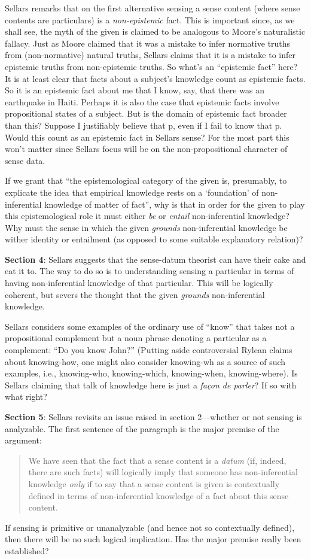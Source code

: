 \documentclass[11pt]{article}
\begin{document}
Sellars remarks that on the first alternative sensing a sense content (where sense contents are particulars) is a \emph{non-epistemic} fact. This is important since, as we shall see, the myth of the given is claimed to be analogous to Moore's naturalistic fallacy. Just as Moore claimed that it was a mistake to infer normative truths from (non-normative) natural truths, Sellars claims that it is a mistake to infer epistemic truths from non-epistemic truths. So what's an ``epistemic fact'' here? It is at least clear that facts about a subject's knowledge count as epistemic facts. So it is an epistemic fact about me that I know, say, that there was an earthquake in Haiti. Perhaps it is also the case that epistemic facts involve propositional states of a subject. But is the domain of epistemic fact broader than this? Suppose I justifiably believe that p, even if I fail to know that p. Would this count as an epistemic fact in Sellars sense? For the most part this won't matter since Sellars focus will be on the non-propositional character of sense data.

If we grant that ``the epistemological category of the given is, presumably, to explicate the idea that empirical knowledge rests on a `foundation' of non-inferential knowledge of matter of fact'', why is that in order for the given to play this epistemological role it must either \emph{be} or \emph{entail} non-inferential knowledge? Why must the sense in which the given \emph{grounds} non-inferential knowledge be wither identity or entailment (as opposed to some suitable explanatory relation)?

\textbf{Section 4}: Sellars suggests that the sense-datum theorist can have their cake and eat it to. The way to do so is to understanding sensing a particular in terms of having non-inferential knowledge of that particular. This will be logically coherent, but severs the thought that the given \emph{grounds} non-inferential knowledge.

Sellars considers some examples of the ordinary use of ``know'' that takes not a propositional complement but a noun phrase denoting a particular as a complement: ``Do you know John?'' (Putting aside controversial Rylean claims about knowing-how, one might also consider knowing-wh as a source of such examples, i.e., knowing-who, knowing-which, knowing-when, knowing-where). Is Sellars claiming that talk of knowledge here is just a \emph{façon de parler}? If so with what right?

\textbf{Section 5}: Sellars revisits an issue raised in section 2---whether or not sensing is analyzable. The first sentence of the paragraph is the major premise of the argument:
\begin{quote}
    We have seen that the fact that a sense content is a \emph{datum} (if, indeed, there are such facts) will logically imply that someone has non-inferential knowledge \emph{only} if to say that a sense content is given is contextually defined in terms of non-inferential knowledge of a fact about this sense content.
\end{quote}
If sensing is primitive or unanalyzable (and hence not so contextually defined), then there will be no such logical implication. Has the major premise really been established?
\end{document}

